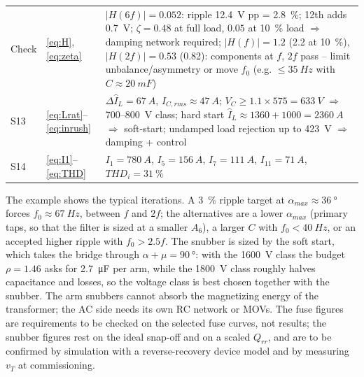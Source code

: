 \documentclass[10pt,a4paper]{scrartcl}
\begin{document}
{\begin{longtable}{@{}l>{\raggedright\arraybackslash}p{}>{\raggedright\arraybackslash}p{}@{}}
Check & \eqref{eq:H}, \eqref{eq:zeta} & $|H(6f)| = 0.052$: ripple \SI{12.4}{V} pp = \SI{2.8}{\percent}; 12th adds \SI{0.7}{V}; $\zeta = 0.48$ at full load, $0.05$ at \SI{10}{\percent} load $\Rightarrow$ damping network required; $|H(f)| = 1.2$ (2.2 at \SI{10}{\percent}), $|H(2f)| = 0.53$ (0.82): components at $f$, $2f$ pass -- limit unbalance/asymmetry or move $f_0$ (e.g. $\le\SI{35}{Hz}$ with $C \approx \SI{20}{mF}$) \\
S13 & \eqref{eq:Lrat}--\eqref{eq:inrush} & $\Delta\hat I_L = \SI{67}{A}$, $I_{C,rms} \approx \SI{47}{A}$; $V_C \ge 1.1\times575 = \SI{633}{V}$ $\Rightarrow$ 700--\SI{800}{V} class; hard start $\hat I_L \approx 1360 + 1000 = \SI{2360}{A}$ $\Rightarrow$ soft-start; undamped load rejection up to \SI{423}{V} $\Rightarrow$ damping + control \\
S14 & \eqref{eq:I1}--\eqref{eq:THD} & $I_1 = \SI{780}{A}$, $I_5 = \SI{156}{A}$, $I_7 = \SI{111}{A}$, $I_{11} = \SI{71}{A}$, $THD_i = \SI{31}{\percent}$ \\
\end{longtable}}

The example shows the typical iterations. A \SI{3}{\percent} ripple target at $\alpha_{max}\approx\SI{36}{\degree}$ forces $f_0\approx\SI{67}{Hz}$, between $f$ and $2f$; the alternatives are a lower $\alpha_{max}$ (primary taps, so that the filter is sized at a smaller $A_6$), a larger $C$ with $f_0 < \SI{40}{Hz}$, or an accepted higher ripple with $f_0 > 2.5f$. The snubber is sized by the soft start, which takes the bridge through $\alpha+\mu = \SI{90}{\degree}$: with the \SI{1600}{V} class the budget $\rho = 1.46$ asks for \SI{2.7}{\micro F} per arm, while the \SI{1800}{V} class roughly halves capacitance and losses, so the voltage class is best chosen together with the snubber. The arm snubbers cannot absorb the magnetizing energy of the transformer; the AC side needs its own RC network or MOVs. The fuse figures are requirements to be checked on the selected fuse curves, not results; the snubber figures rest on the ideal snap-off and on a scaled $Q_{rr}$, and are to be confirmed by simulation with a reverse-recovery device model and by measuring $v_T$ at commissioning.
\end{document}
